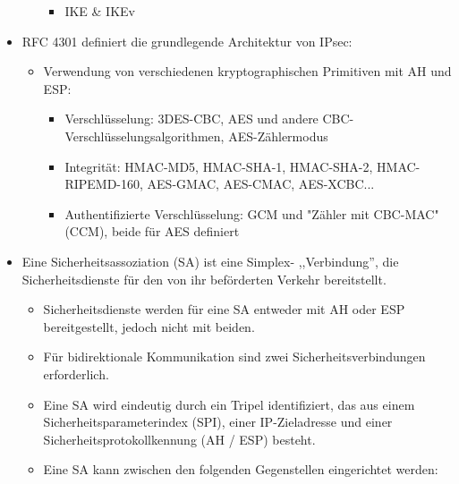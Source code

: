 \documentclass[a4paper]{article}
\begin{document}
\begin{multicols}{3}
\begin{itemize}
\begin{itemize}
                        \begin{itemize}
                            \item
                                  IKE \& IKEv
                        \end{itemize}
              \end{itemize}
        \item
              RFC 4301 definiert die grundlegende Architektur von IPsec:

              \begin{itemize}
                  \item
                        Verwendung von verschiedenen kryptographischen Primitiven mit AH und
                        ESP:

                        \begin{itemize}
                            \item
                                  Verschlüsselung: 3DES-CBC, AES und andere
                                  CBC-Verschlüsselungsalgorithmen, AES-Zählermodus
                            \item
                                  Integrität: HMAC-MD5, HMAC-SHA-1, HMAC-SHA-2, HMAC- RIPEMD-160,
                                  AES-GMAC, AES-CMAC, AES-XCBC...
                            \item
                                  Authentifizierte Verschlüsselung: GCM und "Zähler mit CBC-MAC"
                                  (CCM), beide für AES definiert
                        \end{itemize}
              \end{itemize}
        \item
              Eine Sicherheitsassoziation (SA) ist eine Simplex- ,,Verbindung'', die
              Sicherheitsdienste für den von ihr beförderten Verkehr bereitstellt.

              \begin{itemize}
                  \item
                        Sicherheitsdienste werden für eine SA entweder mit AH oder ESP
                        bereitgestellt, jedoch nicht mit beiden.
                  \item
                        Für bidirektionale Kommunikation sind zwei Sicherheitsverbindungen
                        erforderlich.
                  \item
                        Eine SA wird eindeutig durch ein Tripel identifiziert, das aus einem
                        Sicherheitsparameterindex (SPI), einer IP-Zieladresse und einer
                        Sicherheitsprotokollkennung (AH / ESP) besteht.
                  \item
                        Eine SA kann zwischen den folgenden Gegenstellen eingerichtet
                        werden:


\end{itemize}
\end{itemize}
\end{multicols}
\end{document}

